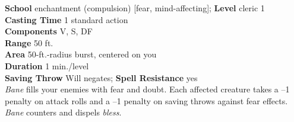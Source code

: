 \textbf{School} enchantment (compulsion) [fear, mind-affecting]; \textbf{Level} cleric 1\\
\textbf{Casting Time} 1 standard action\\
\textbf{Components} V, S, DF\\
\textbf{Range} 50 ft.\\
\textbf{Area} 50-ft.-radius burst, centered on you\\
\textbf{Duration} 1 min./level\\
\textbf{Saving Throw }Will negates; \textbf{Spell Resistance} yes\\
\textit{Bane }fills your enemies with fear and doubt. Each affected creature takes a –1 penalty on attack rolls and a –1 penalty on saving throws against fear effects. \textit{Bane }counters and dispels \textit{bless}.\\
